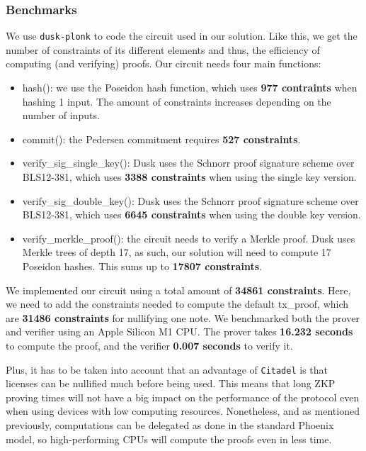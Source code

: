 \subsubsection{Benchmarks}

We use \verb!dusk-plonk! to code the circuit used in our solution. Like this, we get the number of constraints of its different elements and thus, the efficiency of computing (and verifying) proofs. Our circuit needs four main functions:

\begin{itemize}
 \item \textsf{hash():} we use the Poseidon hash function, which uses \textbf{977 contraints} when hashing 1 input. The amount of constraints increases depending on the number of inputs.

 \item \textsf{commit():} the Pedersen commitment requires \textbf{527 constraints}.

 \item \textsf{verify\_sig\_single\_key():} Dusk uses the Schnorr proof signature scheme over BLS12-381, which uses \textbf{3388 constraints} when using the single key version.

 \item \textsf{verify\_sig\_double\_key():} Dusk uses the Schnorr proof signature scheme over BLS12-381, which uses \textbf{6645 constraints} when using the double key version.

 \item \textsf{verify\_merkle\_proof():} the circuit needs to verify a Merkle proof. Dusk uses Merkle trees of depth 17, as such, our solution will need to compute 17 Poseidon hashes. This sums up to \textbf{17807 constraints}. 
\end{itemize}

We implemented our circuit using a total amount of \textbf{34861 constraints}. Here, we need to add the constraints needed to compute the default \textsf{tx\_proof}, which are \textbf{31486 constraints} for nullifying one note. We benchmarked both the prover and verifier using an Apple Silicon M1 CPU. The prover takes \textbf{16.232 seconds} to compute the proof, and the verifier \textbf{0.007 seconds} to verify it.

Plus, it has to be taken into account that an advantage of \verb!Citadel! is that licenses can be nullified much before being used. This means that long ZKP proving times will not have a big impact on the performance of the protocol even when using devices with low computing resources. Nonetheless, and as mentioned previously, computations can be delegated as done in the standard Phoenix model, so high-performing CPUs will compute the proofs even in less time.


